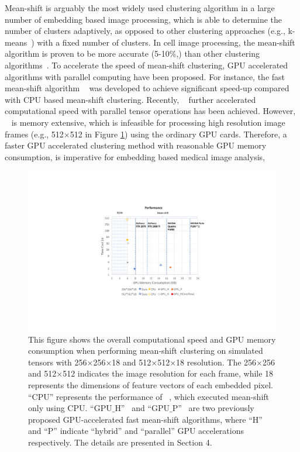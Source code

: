 \documentclass[journal,twoside,web]{ieeecolor}
\begin{document}
Mean-shift is arguably the most widely used clustering algorithm in a large number of embedding based image processing, which is able to determine the number of clusters adaptively, as opposed to other clustering approaches (e.g., k-means~\cite{b29}) with a fixed number of clusters. In cell image processing, the mean-shift algorithm is proven to be more accurate (5-10\%,) than other clustering algorithms~\cite{b15,b28}. To accelerate the speed of mean-shift clustering, GPU accelerated algorithms with parallel computing have been proposed. For instance, the fast mean-shift algorithm ~\cite{b19} was developed to achieve significant speed-up compared with CPU based mean-shift clustering. Recently, ~\cite{b18} further accelerated computational speed with parallel tensor operations has been achieved. However, ~\cite{b18} is memory extensive, which is infeasible for processing high resolution image frames (e.g., 512$\times$512 in Figure \ref{fig1}) using the ordinary GPU cards. Therefore, a faster GPU accelerated clustering method with reasonable GPU memory consumption, is imperative for embedding based medical image analysis, 

\begin{figure}[h]
\centerline{\includegraphics[width=\columnwidth]{1.pdf}}
\caption{This figure shows the overall computational speed and GPU memory consumption when performing mean-shift clustering on simulated tensors with 256$\times$256$\times$18 and 512$\times$512$\times$18 resolution. The 256$\times$256 and 512$\times$512 indicates the image resolution for each frame, while 18 represents the dimensions of feature vectors of each embedded pixel. ``CPU'' represents the performance of ~\cite{b15}, which executed mean-shift only using CPU. ``GPU$\_$H''~\cite{b19} and ``GPU$\_$P''~\cite{b18} are two previously proposed GPU-accelerated fast mean-shift algorithms, where ``H'' and ``P'' indicate ``hybrid'' and ``parallel'' GPU accelerations respectively. The details are presented in Section 4.}
\label{fig1}
\end{figure}
\end{document}
